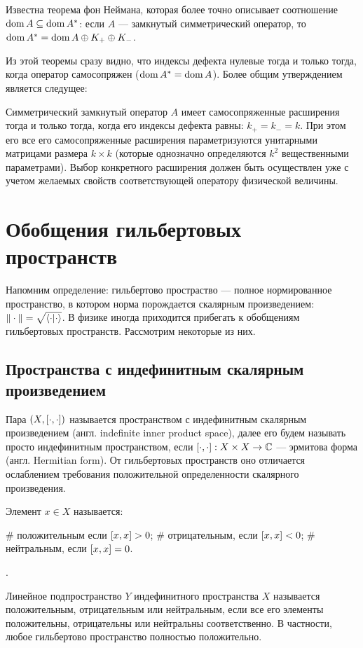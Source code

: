 Известна теорема фон Неймана, которая более точно описывает соотношение $\operatorname{dom} A \subseteq \operatorname{dom} A^*$: если $A$ — замкнутый симметрический оператор, то $\operatorname{dom} A^* = \operatorname{dom} A \oplus K_+ \oplus K_-$.

Из этой теоремы сразу видно, что индексы дефекта нулевые тогда и только тогда, когда оператор самосопряжен ($\operatorname{dom} A^* = \operatorname{dom} A$). Более общим утверждением является следущее:

Симметрический замкнутый оператор $A$ имеет самосопряженные расширения тогда и только тогда, когда его индексы дефекта равны: $k_+ = k_- = k$. При этом его все его самосопряженные расширения параметризуются унитарными матрицами размера $k \times k$ (которые однозначно определяются $k^2$ вещественными параметрами). Выбор конкретного расширения должен быть осуществлен уже с учетом желаемых свойств соответствующей оператору физической величины.
\section{Обобщения гильбертовых пространств}
Напомним определение: гильбертово простраство — полное нормированное пространство, в котором норма порождается скалярным произведением: $\|\cdot\| = \sqrt{\ip{\cdot}{\cdot}}$. В физике иногда приходится прибегать к обобщениям гильбертовых пространств. Рассмотрим некоторые из них.

\subsection{Пространства с индефинитным скалярным произведением}
Пара $(X, [\cdot,\cdot])$ называется пространством с индефинитным скалярным произведением (англ. indefinite inner product space), далее его будем называть просто индефинитным пространством, если $[\cdot,\cdot]: X \times X \to \mathbb{C}$ — эрмитова форма (англ. Hermitian form). От гильбертовых пространств оно отличается ослаблением требования положительной определенности скалярного произведения.

Элемент $x \in X$ называется:
\begin{ilist}
# положительным если $[x,x] > 0$;
# отрицательным, если $[x,x] < 0$;
# нейтральным, если $[x,x] = 0$.
\end{ilist}.

Линейное подпространство $Y$ индефинитного пространства $X$ называется положительным, отрицательным или нейтральным, если все его элементы положительны, отрицательны или нейтральны соответственно. В частности, любое гильбертово пространство полностью положительно.

